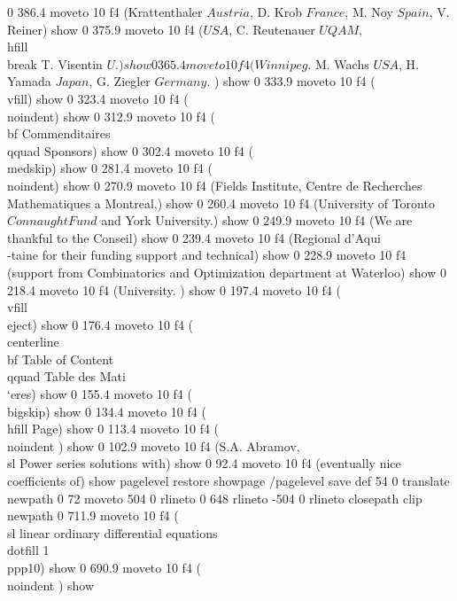 0 386.4 moveto
10 f4
(Krattenthaler \(Austria\), D. Krob \(France\), M. Noy \(Spain\), V. Reiner) show
0 375.9 moveto
10 f4
(\(USA\),  C. Reutenauer \(UQAM\), \\hfill\\break T. Visentin \(U.) show
0 365.4 moveto
10 f4
(Winnipeg\).  M. Wachs \(USA\), H. Yamada \(Japan\), G. Ziegler \(Germany\). ) show
0 333.9 moveto
10 f4
(\\vfill) show
0 323.4 moveto
10 f4
(\\noindent) show
0 312.9 moveto
10 f4
({\\bf  Commenditaires \\qquad Sponsors}) show
0 302.4 moveto
10 f4
(\\medskip) show
0 281.4 moveto
10 f4
(\\noindent) show
0 270.9 moveto
10 f4
(Fields Institute, Centre de Recherches Mathematiques a Montreal,) show
0 260.4 moveto
10 f4
(University of Toronto \(Connaught Fund\)  and York University.) show
0 249.9 moveto
10 f4
(We are thankful to the Conseil) show
0 239.4 moveto
10 f4
(Regional d'Aqui\\-taine for their funding support and technical) show
0 228.9 moveto
10 f4
(support from Combinatorics and Optimization department at Waterloo) show
0 218.4 moveto
10 f4
(University. ) show
0 197.4 moveto
10 f4
(\\vfill\\eject) show
0 176.4 moveto
10 f4
(\\centerline{\\bf Table of Content \\qquad Table des Mati\\`eres}) show
0 155.4 moveto
10 f4
(\\bigskip) show
0 134.4 moveto
10 f4
(\\hfill Page) show
0 113.4 moveto
10 f4
(\\noindent     ) show
0 102.9 moveto
10 f4
(S.A. Abramov,  {\\sl Power series solutions with) show
0 92.4 moveto
10 f4
(eventually nice coefficients of}) show
pagelevel restore
showpage
/pagelevel save def
54 0 translate
newpath 0 72 moveto 504 0 rlineto 0 648 rlineto -504 0 rlineto  closepath clip newpath
0 711.9 moveto
10 f4
({\\sl linear ordinary differential equations}\\dotfill  1\\ppp{10}) show
0 690.9 moveto
10 f4
(\\noindent     ) show
